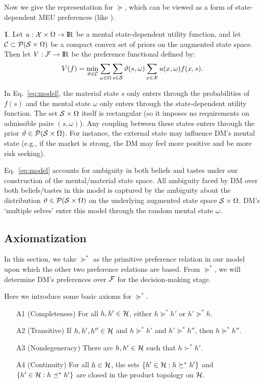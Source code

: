 \documentclass[11pt,oneside]{article}
\theoremstyle{plain}
\theoremstyle{plain}
\theoremstyle{plain}
\theoremstyle{plain}
\theoremstyle{plain}
\theoremstyle{definition}
\newtheorem{defn}[thm]{\protect\definitionname}
\theoremstyle{definition}
\theoremstyle{remark}
\theoremstyle{plain}
\providecommand{\definitionname}{Definition}
\newcommand{\R}{{\rm I\!R}}
\newcommand{\F}{{\cal F}}
\renewcommand{\Re}{\R}
\renewcommand{\Re}{\R}
\newcommand{\mcs}{{\cal S}}
\newcommand{\mcx}{{\cal X}}
\newcommand{\pf}{\succeq}
\newcommand{\pfs}{\succeq^*}
\begin{document}
Now we give the representation for $\pf$, which can be viewed as a form of state-dependent MEU preferences (like \cite{hill2019non}).

\begin{defn}
\label{defn:model}
Let $u : {\cal X} \times \Omega \rightarrow \R$ be a mental state-dependent utility function, and let ${\cal C} \subset {\cal P}(\mcs \times \Omega)$ be a compact convex set of priors on the augmented state space.
Then let $V : {\cal F} \rightarrow \Re$ be the preference functional defined by:
%
\begin{equation}
\label{eq:model}
V(f) = \min_{\vartheta \in {\cal C}} \sum_{\omega\in \Omega}\sum_{s \in \mcs} \vartheta(s,\omega) \sum_{x\in \mcx}u(x,\omega)f(x,s).
\end{equation}
%
\end{defn}
\noindent
In Eq.~\eqref{eq:model}, the material state $s$ only enters through the probabilities of $f(s)$ and the mental state $\omega$ only enters through the state-dependent utility function.
The set $ \mcs \times \Omega$ itself is rectangular (so it imposes no requirements on admissible pairs $(s, \omega)$).
Any coupling between these states enters through the prior $\vartheta \in {\cal P}(\mcs \times \Omega)$.
For instance, the external state may influence DM's mental state (e.g., if the market is strong, the DM may feel more positive and be more risk seeking).

Eq.~\eqref{eq:model} accounts for ambiguity in both beliefs and tastes under our construction of the mental/material state space.
All ambiguity faced by DM over both beliefs/tastes in this model is captured by the ambiguity about the distribution $\vartheta \in {\cal P}(\mcs \times \Omega)$ on the underlying augmented state space $\mcs \times \Omega$.
DM's `multiple selves' enter this model through the random mental state $\omega$.




\subsection{Axiomatization}
\label{sec:axiomatization_mental_state}

In this section, we take $\pfs$ as the primitive preference relation in our model upon which the other two preference relations are based.
From $\pfs$, we will determine DM's preferences over $\F$ for the decision-making stage.

Here we introduce some basic axioms for $\pfs$.
%
\begin{itemize}
    \item[A1] (Completeness) For all $h, h' \in {\cal H}$, either $h \pfs h'$ or $h' \pfs h$.
    \item[A2] (Transitive) If $h, h', h'' \in {\cal H}$ and $h \pfs h'$ and $h' \pfs h''$, then $h \pfs h''$.
    \item[A3] (Nondegeneracy) There are $h, h' \in {\cal H}$ such that $h \succ^* h'$.
    \item[A4] (Continuity) For all $h \in {\cal H}$, the sets $\{h' \in {\cal H} : h \pfs h'\}$ and $\{h' \in {\cal H} : h \preceq^* h'\}$ are closed in the product topology on ${\cal H}$.
\end{itemize}
%
\end{document}
